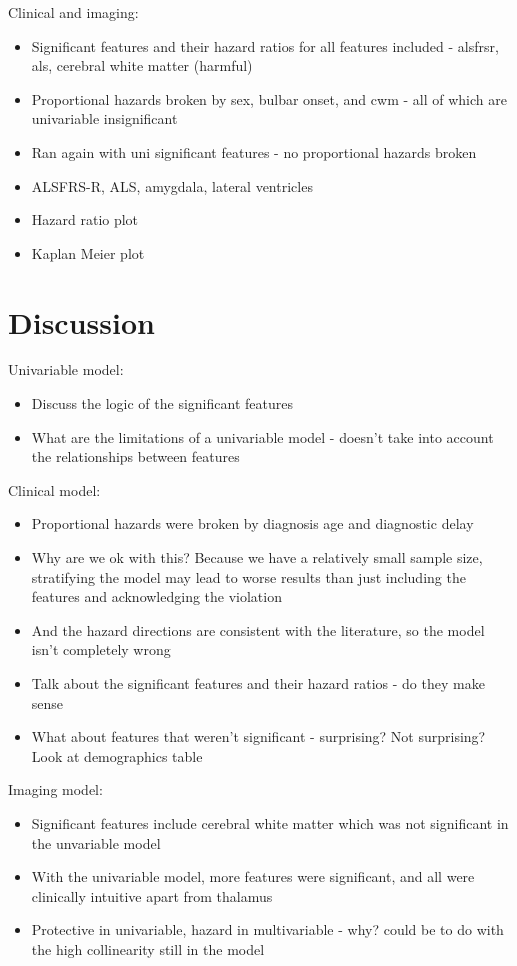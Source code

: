 Clinical and imaging:
\begin{itemize}
    \item Significant features and their hazard ratios for all features included - alsfrsr, als, cerebral white matter (harmful)
    \item Proportional hazards broken by sex, bulbar onset, and cwm - all of which are univariable insignificant
    \item Ran again with uni significant features - no proportional hazards broken
    \item ALSFRS-R, ALS, amygdala, lateral ventricles
    \item Hazard ratio plot
    \item Kaplan Meier plot
\end{itemize}

\section{Discussion}

Univariable model:
\begin{itemize}
    \item Discuss the logic of the significant features
    \item What are the limitations of a univariable model - doesn't take into account the relationships between features
\end{itemize}

Clinical model:
\begin{itemize}
    \item Proportional hazards were broken by diagnosis age and diagnostic delay
    \item Why are we ok with this? Because we have a relatively small sample size, stratifying the model may lead to worse results than just including the features and acknowledging the violation
    \item And the hazard directions are consistent with the literature, so the model isn't completely wrong
    \item Talk about the significant features and their hazard ratios - do they make sense
    \item What about features that weren't significant - surprising? Not surprising? Look at demographics table
\end{itemize}

Imaging model:
\begin{itemize}
    \item Significant features include cerebral white matter which was not significant in the unvariable model
    \item With the univariable model, more features were significant, and all were clinically intuitive apart from thalamus
    \item Protective in univariable, hazard in multivariable - why? could be to do with the high collinearity still in the model
\end{itemize}

